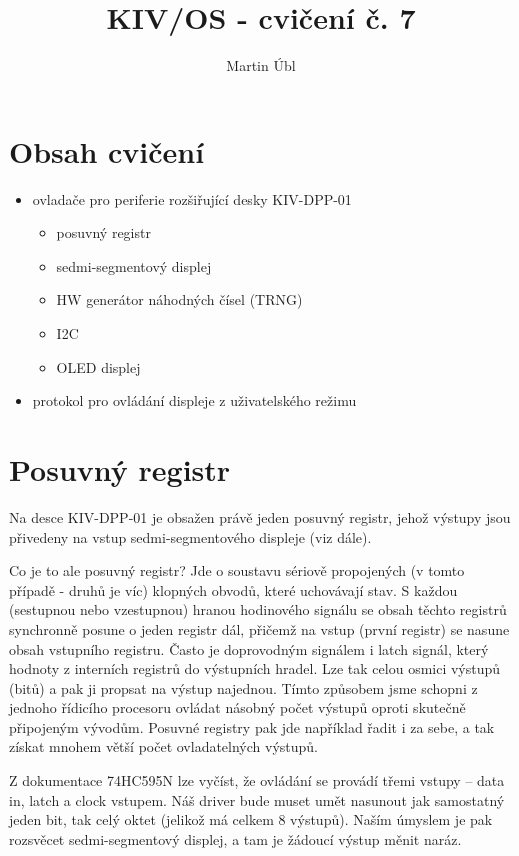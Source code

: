 \documentclass{article}
\author{Martin Úbl}
\title{KIV/OS - cvičení č. 7}
\begin{document}
\maketitle

\section{Obsah cvičení}

\begin{itemize}
	\item ovladače pro periferie rozšiřující desky KIV-DPP-01
		\begin{itemize}
			\item posuvný registr
			\item sedmi-segmentový displej
			\item HW generátor náhodných čísel (TRNG)
			\item I2C
			\item OLED displej
		\end{itemize}
	\item protokol pro ovládání displeje z uživatelského režimu
\end{itemize}

\section{Posuvný registr}

Na desce KIV-DPP-01 je obsažen právě jeden posuvný registr, jehož výstupy jsou přivedeny na vstup sedmi-segmentového displeje (viz dále).

Co je to ale posuvný registr? Jde o soustavu sériově propojených (v tomto případě - druhů je víc) klopných obvodů, které uchovávají stav. S každou (sestupnou nebo vzestupnou) hranou hodinového signálu se obsah těchto registrů synchronně posune o jeden registr dál, přičemž na vstup (první registr) se nasune obsah vstupního registru. Často je doprovodným signálem i latch signál, který  hodnoty z interních registrů do výstupních hradel. Lze tak  celou osmici výstupů (bitů) a pak ji propsat na výstup najednou. Tímto způsobem jsme schopni z jednoho řídicího procesoru ovládat násobný počet výstupů oproti skutečně připojeným vývodům. Posuvné registry pak jde například řadit i za sebe, a tak získat mnohem větší počet ovladatelných výstupů.

Z dokumentace 74HC595N lze vyčíst, že ovládání se provádí třemi vstupy -- data in, latch a clock vstupem. Náš driver bude muset umět nasunout jak samostatný jeden bit, tak celý oktet (jelikož má celkem 8 výstupů). Naším úmyslem je pak rozsvěcet sedmi-segmentový displej, a tam je žádoucí výstup měnit naráz.
\end{document}
